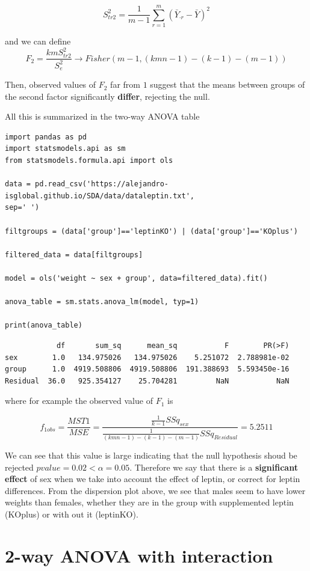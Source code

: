 \documentclass[
]{book}
\begin{document}
\[S^2_{tr2}=\frac{1}{m-1} \sum_{r=1}^m(\bar{Y}_{\cdot r}-\bar{Y})^2\]

and we can define \[F_2=\frac{kmS_{tr2}^2}{S_{e}^2}\rightarrow Fisher(m-1,(kmn-1)-(k-1)-(m-1))\]

Then, observed values of \(F_2\) far from \(1\) suggest that the means between groups of the second factor significantly \textbf{differ}, rejecting the null.

All this is summarized in the two-way ANOVA table

\begin{verbatim}
import pandas as pd
import statsmodels.api as sm
from statsmodels.formula.api import ols

data = pd.read_csv('https://alejandro-isglobal.github.io/SDA/data/dataleptin.txt', 
sep=' ')

filtgroups = (data['group']=='leptinKO') | (data['group']=='KOplus')

filtered_data = data[filtgroups]

model = ols('weight ~ sex + group', data=filtered_data).fit()

anova_table = sm.stats.anova_lm(model, typ=1)

print(anova_table)
\end{verbatim}

\begin{verbatim}
            df       sum_sq      mean_sq           F        PR(>F)
sex        1.0   134.975026   134.975026    5.251072  2.788981e-02
group      1.0  4919.508806  4919.508806  191.388693  5.593450e-16
Residual  36.0   925.354127    25.704281         NaN           NaN
\end{verbatim}

where for example the observed value of \(F_1\) is

\[f_{1obs}=\frac{MST1}{MSE}=\frac{\frac{1}{k-1}SSq_{sex}}{\frac{1}{(kmn-1)-(k-1)-(m-1)}SSq_{Residual}}=5.2511\]

We can see that this value is large indicating that the null hypothesis shoud be rejected \(pvalue=0.02<\alpha=0.05\). Therefore we say that there is a \textbf{significant effect} of sex when we take into account the effect of leptin, or correct for leptin differences. From the dispersion plot above, we see that males seem to have lower weights than females, whether they are in the group with supplemented leptin (KOplus) or with out it (leptinKO).

\hypertarget{way-anova-with-interaction}{%
\section{2-way ANOVA with interaction}\label{way-anova-with-interaction}}
\end{document}
